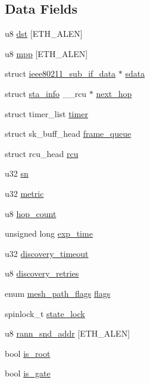 \subsection*{Data Fields}
\begin{DoxyCompactItemize}
\item 
u8 \hyperlink{structmesh__path_a7e206c9dbce55c0147656b4e271c71e4}{dst} \mbox{[}E\-T\-H\-\_\-\-A\-L\-E\-N\mbox{]}
\item 
u8 \hyperlink{structmesh__path_a48b50421cfec4f69ffc3b753f7019185}{mpp} \mbox{[}E\-T\-H\-\_\-\-A\-L\-E\-N\mbox{]}
\item 
struct \hyperlink{structieee80211__sub__if__data}{ieee80211\-\_\-sub\-\_\-if\-\_\-data} $\ast$ \hyperlink{structmesh__path_ad829d8d33f06a7245cc303f924f259ac}{sdata}
\item 
struct \hyperlink{structsta__info}{sta\-\_\-info} \-\_\-\-\_\-rcu $\ast$ \hyperlink{structmesh__path_abc4b3146b43964101d2a25163375fed0}{next\-\_\-hop}
\item 
struct timer\-\_\-list \hyperlink{structmesh__path_ae8aedee6c0bd2f7edbb10f18d574f107}{timer}
\item 
struct sk\-\_\-buff\-\_\-head \hyperlink{structmesh__path_a78a751fa8f8fb1623ed2b86bd59017db}{frame\-\_\-queue}
\item 
struct rcu\-\_\-head \hyperlink{structmesh__path_aa9677537ffa4e40f3c4f3e9fb3b4c76d}{rcu}
\item 
u32 \hyperlink{structmesh__path_a3a5989b8e6d4286ac3822b65bbc1cf16}{sn}
\item 
u32 \hyperlink{structmesh__path_aecb5673e0ccbdfd6e104e917abc4bdfe}{metric}
\item 
u8 \hyperlink{structmesh__path_a65c900d253cc9afe77e2aa7a5c3ded5a}{hop\-\_\-count}
\item 
unsigned long \hyperlink{structmesh__path_af01b3e5a14761c34e4298e254fb7c094}{exp\-\_\-time}
\item 
u32 \hyperlink{structmesh__path_a7875d6c0fb79d3ecfa1bedcdbc7e9704}{discovery\-\_\-timeout}
\item 
u8 \hyperlink{structmesh__path_a7ce70c7ff6bf0aef3fec882ad4959555}{discovery\-\_\-retries}
\item 
enum \hyperlink{mesh_8h_a1108038688d583a88056a1ebebd89fa2}{mesh\-\_\-path\-\_\-flags} \hyperlink{structmesh__path_acdca1d9efeb99cd79e04eaaf7b94f159}{flags}
\item 
spinlock\-\_\-t \hyperlink{structmesh__path_a906a637c5d4df9d7a2a5a407cc01b8ac}{state\-\_\-lock}
\item 
u8 \hyperlink{structmesh__path_a3c1c259f27b1cdda2e17a81ff98a5310}{rann\-\_\-snd\-\_\-addr} \mbox{[}E\-T\-H\-\_\-\-A\-L\-E\-N\mbox{]}
\item 
bool \hyperlink{structmesh__path_a860e4167ebf87a0635c678a614b96a99}{is\-\_\-root}
\item 
bool \hyperlink{structmesh__path_a4399b726e2ce468eb33d179378d68e21}{is\-\_\-gate}
\end{DoxyCompactItemize}



